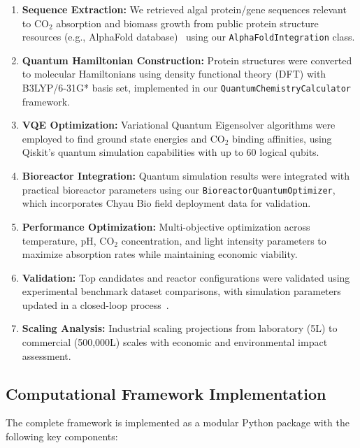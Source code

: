 \documentclass{article}
\begin{document}
\begin{enumerate}
    \item \textbf{Sequence Extraction:} We retrieved algal protein/gene sequences relevant to CO$_2$ absorption and biomass growth from public protein structure resources (e.g., AlphaFold database)~\cite{alphafold_nature,alphafold_db,alphafold_embl} using our \texttt{AlphaFoldIntegration} class.
    
    \item \textbf{Quantum Hamiltonian Construction:} Protein structures were converted to molecular Hamiltonians using density functional theory (DFT) with B3LYP/6-31G* basis set, implemented in our \texttt{QuantumChemistryCalculator} framework.
    
    \item \textbf{VQE Optimization:} Variational Quantum Eigensolver algorithms were employed to find ground state energies and CO$_2$ binding affinities, using Qiskit's quantum simulation capabilities with up to 60 logical qubits.
    
    \item \textbf{Bioreactor Integration:} Quantum simulation results were integrated with practical bioreactor parameters using our \texttt{BioreactorQuantumOptimizer}, which incorporates Chyau Bio field deployment data for validation.
    
    \item \textbf{Performance Optimization:} Multi-objective optimization across temperature, pH, CO$_2$ concentration, and light intensity parameters to maximize absorption rates while maintaining economic viability.
    
    \item \textbf{Validation:} Top candidates and reactor configurations were validated using experimental benchmark dataset comparisons, with simulation parameters updated in a closed-loop process~\cite{bigalgae2018}.
    
    \item \textbf{Scaling Analysis:} Industrial scaling projections from laboratory (5L) to commercial (500,000L) scales with economic and environmental impact assessment.
\end{enumerate}

\subsection{Computational Framework Implementation}

The complete framework is implemented as a modular Python package with the following key components:
\end{document}
